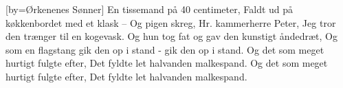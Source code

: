 [by={Ørkenenes Sønner}]
\beginverse
En tissemand på 40 centimeter,
Faldt ud på køkkenbordet med et klask -- 
Og pigen skreg,
Hr. kammerherre Peter,
Jeg tror den trænger til en kogevask.
Og hun tog fat og gav den kunstigt åndedræt,
Og som en flagstang gik den op i stand - gik den op i stand.
Og det som meget hurtigt fulgte efter,
Det fyldte let halvanden malkespand.
Og det som meget hurtigt fulgte efter,
Det fyldte let halvanden malkespand. 
\endverse
\endsong